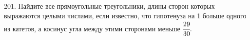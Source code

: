 201. Найдите все прямоугольные треугольники, длины сторон которых выражаются целыми числами, если известно, что гипотенуза на 1 больше одного из катетов, а косинус угла между этими сторонами меньше $\cfrac{29}{30}.$\\
